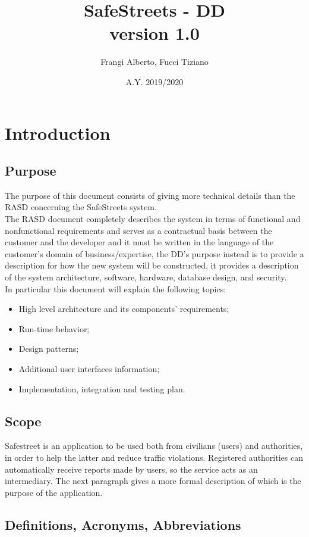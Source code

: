 \documentclass[12pt,a4paper]{report}
\title{SafeStreets - DD \\ \large version 1.0}
\author{Frangi Alberto, Fucci Tiziano}
\date{A.Y. 2019/2020}
\begin{document}
	\maketitle
	\tableofcontents 
	\chapter{Introduction}
		\section{Purpose}
			The purpose of this document consists of giving more technical details than the RASD concerning the SafeStreets
			system.\\
			The RASD document completely describes the system in terms of functional and nonfunctional requirements and
			serves as a contractual basis between the customer and the developer and it must be written in the language of
			the customer's domain of business/expertise, the DD's purpose instead is to provide a description for how the new
			system will be constructed, it provides a description of the system architecture, software, hardware, database
			design, and security.\\
			In particular this document will explain the following topics:
			\begin{itemize}
				\item High level architecture and its components' requirements;
				\item Run-time behavior;
				\item Design patterns;
				\item Additional user interfaces information;
				\item Implementation, integration and testing plan.
			\end{itemize}
		\section{Scope}
			Safestreet is an application to be used both from civilians (users) and authorities, in order to help the latter and
			reduce traffic violations. Registered authorities can automatically receive reports made by users, so the service acts
			as an intermediary. The next paragraph gives a more formal description of which is the purpose of the application.

		\section{Definitions, Acronyms, Abbreviations}
\end{document}
